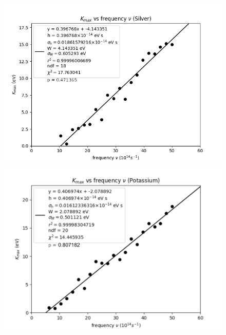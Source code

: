 \documentclass{article}
\begin{document}
\begin{itemize}
  \begin{figure}[ht!]
    \centering
    \begin{minipage}[b]{0.45\textwidth}
      \includegraphics[width=\textwidth]{silver_plot_1.png}
    \end{minipage}
  \hfill
    \begin{minipage}[b]{0.45\textwidth}
      \includegraphics[width=\textwidth]{potassium_plot_1.png}
    \end{minipage}
  \end{figure}


\end{itemize}
\end{document}
